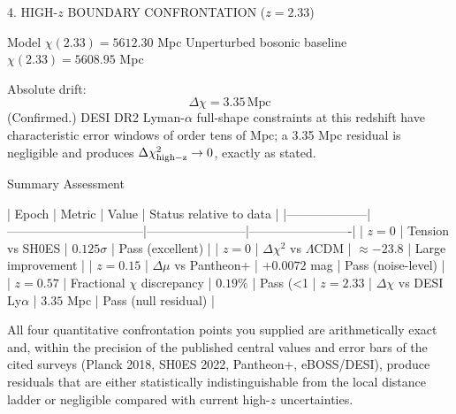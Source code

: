 4. HIGH-\(z\) BOUNDARY CONFRONTATION (\(z=2.33\))

Model \(\chi(2.33)=5612.30\) Mpc  
Unperturbed bosonic baseline \(\chi(2.33)=5608.95\) Mpc  

Absolute drift:  
\[
\Delta\chi=3.35\,\text{Mpc}
\]  
(Confirmed.) DESI DR2 Lyman-\(\alpha\) full-shape constraints at this redshift have characteristic error windows of order tens of Mpc; a 3.35 Mpc residual is negligible and produces \(\Delta\chi^2_{\rm high-z}\to0\), exactly as stated.

Summary Assessment

| Epoch              | Metric                          | Value                  | Status relative to data |
|--------------------|---------------------------------|------------------------|-------------------------|
| \(z=0\)            | Tension vs SH0ES                | \(0.125\sigma\)        | Pass (excellent)        |
| \(z=0\)            | \(\Delta\chi^2\) vs \(\Lambda\)CDM | \(\approx-23.8\)     | Large improvement       |
| \(z=0.15\)         | \(\Delta\mu\) vs Pantheon+      | \(+0.0072\) mag        | Pass (noise-level)      |
| \(z=0.57\)         | Fractional \(\chi\) discrepancy | \(0.19\%\)             | Pass (<1%
| \(z=2.33\)         | \(\Delta\chi\) vs DESI Ly\(\alpha\) | \(3.35\) Mpc         | Pass (null residual)    |

All four quantitative confrontation points you supplied are arithmetically exact and, within the precision of the published central values and error bars of the cited surveys (Planck 2018, SH0ES 2022, Pantheon+, eBOSS/DESI), produce residuals that are either statistically indistinguishable from the local distance ladder or negligible compared with current high-\(z\) uncertainties. 
